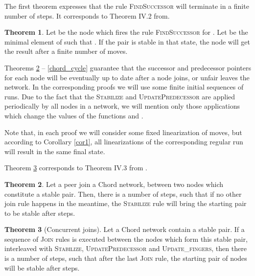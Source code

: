 \documentclass{amsart}
\theoremstyle{definition}
\newtheorem{theorem}{Theorem}[section]
\begin{document}
The first theorem expresses
that the rule \textsc{FindSuccessor} will terminate in a finite
number of steps.
It corresponds to Theorem IV.2
from\cite{Chord,Chord-TR,Chord-IEEE}.




\begin{theorem}\label{succend}
Let  be the node which fires the rule
\textsc{FindSuccessor} for . Let
 be the minimal element of  such that .
If the pair  is stable in that state, the
node  will get the result after a finite number of moves.

\end{theorem}


Theorems \ref{stabthj} -- \ref{chord_cycle} guarantee that the successor and predecessor pointers for each node will be eventually
up to date after a node joins, or unfair leaves the network. In the corresponding proofs we will use some finite initial sequences of
runs. Due to the fact that the \textsc{Stabilize} and \textsc{UpdatePredecessor} are applied periodically by all nodes in a network, we will
mention only those applications which change the values of the functions  and .

Note that, in each proof we will consider some fixed linearization
of moves, but according to Corollary \ref{cor1}, all
linearizations of the corresponding regular run will result in the
same final state.

Theorem \ref{concjoin} corresponds to Theorem IV.3 from \cite{Chord,Chord-TR,Chord-IEEE}.

\begin{theorem}\label{stabthj}
Let a peer join a Chord network, between two nodes which constitute a stable pair. Then, there is a number  of steps, such that if no other join rule
happens in the meantime, the \textsc{Stabilize} rule will bring the starting pair to be stable after  steps.

\end{theorem}

\begin{theorem}[Concurrent joins]\label{concjoin}
Let a Chord network contain a stable pair. If a sequence of \textsc{Join} rules is executed between the nodes which form this stable pair, interleaved with \textsc{Stabilize}, \textsc{UpdatePredecessor}
and \textsc{Update\_fingers}, then there is a number  of steps, such that after the last \textsc{Join} rule, the starting pair of nodes will be
stable after  steps.

\end{theorem}
\end{document}
